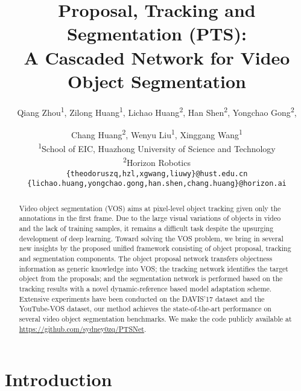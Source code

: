 \documentclass[10pt,twocolumn,letterpaper]{article}
\makeatletter
\newcommand*{\affaddr}[1]{#1} \newcommand*{\affmark}[1][*]{\textsuperscript{#1}}
\newcommand*{\email}[1]{\texttt{#1}}
\newcommand{\printfnsymbol}[1]{\textsuperscript{\@fnsymbol{#1}}}
\makeatother
\begin{document}
\title{Proposal, Tracking and Segmentation (PTS): \\ A Cascaded Network for Video Object Segmentation}

\author{
	Qiang Zhou\affmark[1]\printfnsymbol{1}, Zilong Huang\affmark[1]\printfnsymbol{1}, Lichao Huang\affmark[2], Han Shen\affmark[2],  Yongchao Gong\affmark[2], \\
	\and Chang Huang\affmark[2], Wenyu Liu\affmark[1], Xinggang Wang\affmark[1]\\
	\affaddr{\affmark[1]School of EIC, Huazhong University of Science and Technology}\\
	\affaddr{\affmark[2]Horizon Robotics}\\
	\email{\tt\small\{theodoruszq,hzl,xgwang,liuwy\}@hust.edu.cn}\\
	\email{\tt\small{\{lichao.huang,yongchao.gong,han.shen,chang.huang\}@horizon.ai}} \\
}
\maketitle

\begin{abstract}
Video object segmentation (VOS) aims at pixel-level object tracking given only the annotations in the first frame. Due to the large visual variations of objects in video and the lack of training samples, it remains a difficult task despite the upsurging development of deep learning. Toward solving the VOS problem, we bring in several new insights by the proposed unified framework consisting of object proposal, tracking and segmentation components. The object proposal network transfers objectness information as generic knowledge into VOS; the tracking network identifies the target object from the proposals; and the segmentation network is performed based on the tracking results with a novel dynamic-reference based model adaptation scheme. Extensive experiments have been conducted on the DAVIS'17 dataset and the YouTube-VOS dataset, our method achieves the state-of-the-art performance on several video object segmentation benchmarks. We make the code publicly available at \url{https://github.com/sydney0zq/PTSNet}.
\end{abstract}

\section{Introduction}

\let\thefootnote\relax{}
\end{document}
